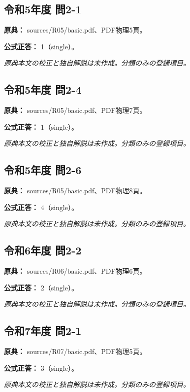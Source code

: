 \subsection{令和5年度 問2-1}
\label{q:r05-reg-basic-2-1}

\noindent\textbf{原典：} sources/R05/basic.pdf、PDF物理5頁。

\textbf{公式正答：} 1（single）。

\par\textit{原典本文の校正と独自解説は未作成。分類のみの登録項目。}

\subsection{令和5年度 問2-4}
\label{q:r05-reg-basic-2-4}

\noindent\textbf{原典：} sources/R05/basic.pdf、PDF物理7頁。

\textbf{公式正答：} 1（single）。

\par\textit{原典本文の校正と独自解説は未作成。分類のみの登録項目。}

\subsection{令和5年度 問2-6}
\label{q:r05-reg-basic-2-6}

\noindent\textbf{原典：} sources/R05/basic.pdf、PDF物理8頁。

\textbf{公式正答：} 4（single）。

\par\textit{原典本文の校正と独自解説は未作成。分類のみの登録項目。}

\subsection{令和6年度 問2-2}
\label{q:r06-reg-basic-2-2}

\noindent\textbf{原典：} sources/R06/basic.pdf、PDF物理6頁。

\textbf{公式正答：} 2（single）。

\par\textit{原典本文の校正と独自解説は未作成。分類のみの登録項目。}

\subsection{令和7年度 問2-1}
\label{q:r07-reg-basic-2-1}

\noindent\textbf{原典：} sources/R07/basic.pdf、PDF物理5頁。

\textbf{公式正答：} 3（single）。

\par\textit{原典本文の校正と独自解説は未作成。分類のみの登録項目。}
